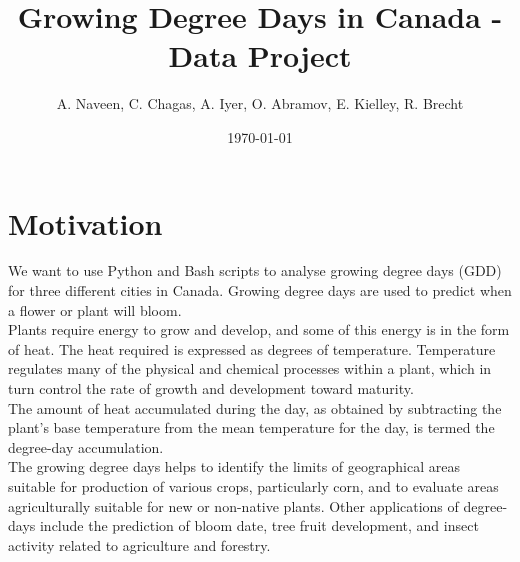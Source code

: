 \documentclass[12pt]{article}
\title{Growing Degree Days in Canada - Data Project}
\author{A. Naveen, C. Chagas, A. Iyer, O. Abramov, E. Kielley, R. Brecht}
\date{\today}
\begin{document}
\maketitle
\vspace{5pt}
\tableofcontents
\vspace{35pt}

\section{Motivation}
We want to use Python and Bash scripts to analyse growing degree days (GDD) for 
three different cities in Canada. Growing degree days are used to predict when a 
flower or plant will bloom. 
\\ Plants require energy to grow and develop, and some of this energy is in the 
form of heat. The heat required is expressed as degrees of temperature. 
Temperature regulates many of the physical and chemical processes within a 
plant, which in turn control the rate of growth and development toward maturity. 
\\The amount of heat accumulated during the day, as obtained by subtracting the
 plant's base temperature from the mean temperature for the day, is termed the
 degree-day accumulation.
\\The growing degree days helps to identify the limits of geographical areas 
suitable for production of various crops, particularly corn, and to evaluate 
areas agriculturally suitable for new or non-native plants. Other applications
of degree-days include the prediction of bloom date, tree fruit development, and
insect activity related to agriculture and forestry.


\pagebreak
\end{document}
